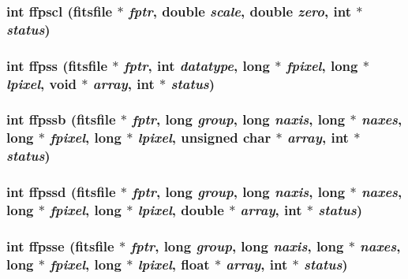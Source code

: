 \subsubsection{\setlength{\rightskip}{0pt plus 5cm}int ffpscl (\bf{fitsfile} $\ast$ {\em fptr}, double {\em scale}, double {\em zero}, int $\ast$ {\em status})}\label{fitsio__64_8h_55e6ba51c52d4c9ea77e745d5029a42c}


\subsubsection{\setlength{\rightskip}{0pt plus 5cm}int ffpss (\bf{fitsfile} $\ast$ {\em fptr}, int {\em datatype}, long $\ast$ {\em fpixel}, long $\ast$ {\em lpixel}, void $\ast$ {\em array}, int $\ast$ {\em status})}\label{fitsio__64_8h_42bee00082b5cb488fa8a440392392b1}


\subsubsection{\setlength{\rightskip}{0pt plus 5cm}int ffpssb (\bf{fitsfile} $\ast$ {\em fptr}, long {\em group}, long {\em naxis}, long $\ast$ {\em naxes}, long $\ast$ {\em fpixel}, long $\ast$ {\em lpixel}, unsigned char $\ast$ {\em array}, int $\ast$ {\em status})}\label{fitsio__64_8h_3c03b253046fc85ef6be13e34ac3d8b2}


\subsubsection{\setlength{\rightskip}{0pt plus 5cm}int ffpssd (\bf{fitsfile} $\ast$ {\em fptr}, long {\em group}, long {\em naxis}, long $\ast$ {\em naxes}, long $\ast$ {\em fpixel}, long $\ast$ {\em lpixel}, double $\ast$ {\em array}, int $\ast$ {\em status})}\label{fitsio__64_8h_005342a1cc091d589dbc8dbfdc577e32}


\subsubsection{\setlength{\rightskip}{0pt plus 5cm}int ffpsse (\bf{fitsfile} $\ast$ {\em fptr}, long {\em group}, long {\em naxis}, long $\ast$ {\em naxes}, long $\ast$ {\em fpixel}, long $\ast$ {\em lpixel}, float $\ast$ {\em array}, int $\ast$ {\em status})}\label{fitsio__64_8h_622b3a307ccbbbba93b0cf910a9c4091}


